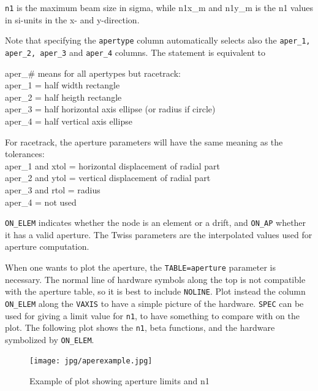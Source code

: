 \texttt{n1} is the maximum beam size in sigma, while n1x\_m and n1y\_m is the n1
values in si-units in the x- and y-direction.  

Note that specifying the \texttt{apertype} column automatically selects also the
\texttt{aper\_1, aper\_2, aper\_3} and \texttt{aper\_4} columns. The statement
is equivalent to

aper\_\# means for all apertypes but racetrack:
\\ aper\_1 = half width rectangle
\\ aper\_2 = half heigth rectangle
\\ aper\_3 = half horizontal axis ellipse (or radius if circle)
\\ aper\_4 = half vertical axis ellipse

For racetrack, the aperture parameters will have the same meaning as the
tolerances: 
\\ aper\_1 and xtol = horizontal displacement of radial part 
\\ aper\_2 and ytol = vertical displacement of radial part 
\\ aper\_3 and rtol = radius 
\\ aper\_4 = not used 

\texttt{ON\_ELEM} indicates whether the node is an element or a drift, and
\texttt{ON\_AP} whether it has a valid aperture. The Twiss parameters are the
interpolated values used for aperture computation.  

When one wants to plot the aperture, the \texttt{TABLE=aperture} parameter
is necessary. The normal line of hardware symbols along the top is not
compatible with the aperture table, so it is best to include
\texttt{NOLINE}. Plot instead the column \texttt{ON\_ELEM} along the
\texttt{VAXIS} to have a simple picture of the hardware. \texttt{SPEC}
can be used for giving a limit value for \texttt{n1}, to have something
to compare with on the plot. The following plot shows the \texttt{n1},
beta functions, and the hardware symbolized by \texttt{ON\_ELEM}.     

\begin{figure}[ht]  
  \centering
  \texttt{[image: jpg/aperexample.jpg]}
  \caption{Example of plot showing aperture limits and n1}
  \label{fig:aperexample}  
\end{figure}


